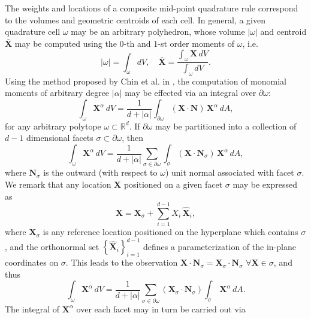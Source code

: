 	The weights and locations of a composite mid-point quadrature rule correspond to the volumes and geometric centroids of each cell. In general, a given quadrature cell $\omega$ may be an arbitrary polyhedron, whose volume $|\omega|$ and centroid $\bar{\mathbf{X}}$ may be computed using the $0$-th and $1$-st order moments of $\omega$, i.e.
	\begin{equation}
		|\omega| = \int_{\omega} dV, \quad \bar{\mathbf{X}} = \frac{\int_{\omega} \mathbf{X} \, dV}{\int_{\omega} dV}.
	\end{equation}
	Using the method proposed by Chin et al. in \cite{Chin:15}, the computation of monomial moments of arbitrary degree $|\alpha|$ may be effected via an integral over $\partial \omega$:
	\begin{equation}
		\int_{\omega} \mathbf{X}^\alpha \, dV = \frac{1}{d+|\alpha|} \int_{\partial \omega} (\mathbf{X} \cdot \mathbf{N}) \, \mathbf{X}^\alpha \, dA,
	\end{equation}
	for any arbitrary polytope $\omega \subset \mathbb{R}^d$. If $\partial \omega$ may be partitioned into a collection of $d-1$ dimensional facets $\sigma \subset \partial \omega$, then
	\begin{equation}
		\int_{\omega} \mathbf{X}^\alpha \, dV = \frac{1}{d+|\alpha|} \sum_{\sigma \in \partial \omega} \int_{\sigma} (\mathbf{X} \cdot \mathbf{N}_{\sigma}) \, \mathbf{X}^\alpha \, dA,
	\end{equation}
	where $\mathbf{N}_\sigma$ is the outward (with respect to $\omega$) unit normal associated with facet $\sigma$. We remark that any location $\mathbf{X}$ positioned on a given facet $\sigma$ may be expressed as
	\begin{equation}
		\mathbf{X} = \mathbf{X}_\sigma + \sum_{i=1}^{d-1} X_i \, \hat{\mathbf{X}}_i,
	\end{equation}
	where $\mathbf{X}_\sigma$ is any reference location positioned on the hyperplane which contains $\sigma$, and the orthonormal set $\left\{ \hat{\mathbf{X}}_i \right\}_{i=1}^{d-1}$ defines a parameterization of the in-plane coordinates on $\sigma$. This leads to the observation $\mathbf{X} \cdot \mathbf{N}_\sigma = \mathbf{X}_\sigma \cdot \mathbf{N}_\sigma \, \, \forall \mathbf{X} \in \sigma$, and thus
	\begin{equation}
		\int_{\omega} \mathbf{X}^\alpha \, dV = \frac{1}{d+|\alpha|} \sum_{\sigma \in \partial \omega} (\mathbf{X}_\sigma \cdot \mathbf{N}_{\sigma}) \int_{\sigma} \, \mathbf{X}^\alpha \, dA.
	\end{equation}
	The integral of $\mathbf{X}^\alpha$ over each facet may in turn be carried out via
